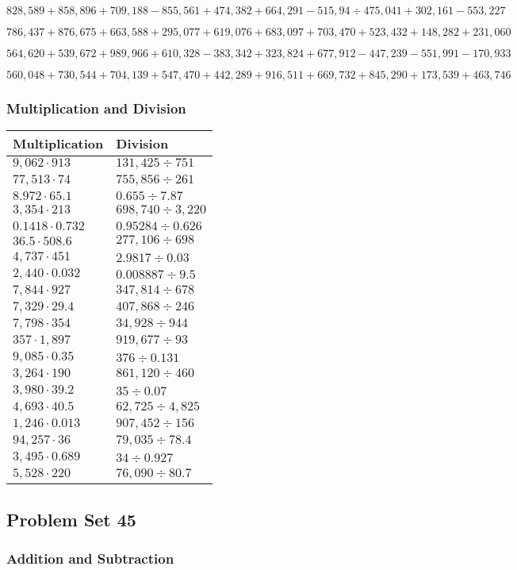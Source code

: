 \(828,589+858,896+709,188-855,561+474,382+664,291-515,94÷475,041+302,161-553,227\)

\(786,437+876,675+663,588+295,077+619,076+683,097+703,470+523,432+148,282+231,060\)

\(564,620+539,672+989,966+610,328-383,342+323,824+677,912-447,239-551,991-170,933\)

\(560,048+730,544+704,139+547,470+442,289+916,511+669,732+845,290+173,539+463,746\)

\hypertarget{multiplication-and-division-348}{%
\subsubsection{Multiplication and
Division}\label{multiplication-and-division-348}}

\begin{longtable}[]{@{}ll@{}}
\toprule
Multiplication & Division\tabularnewline
\midrule
\endhead
\(9,062\cdot913\) & \(131,425÷751\)\tabularnewline
\(77,513\cdot74\) & \(755,856÷261\)\tabularnewline
\(8.972\cdot65.1\) & \(0.655÷7.87\)\tabularnewline
\(3,354\cdot213\) & \(698,740÷3,220\)\tabularnewline
\(0.1418\cdot0.732\) & \(0.95284÷0.626\)\tabularnewline
\(36.5\cdot508.6\) & \(277,106÷698\)\tabularnewline
\(4,737\cdot451\) & \(2.9817÷0.03\)\tabularnewline
\(2,440\cdot0.032\) & \(0.008887÷9.5\)\tabularnewline
\(7,844\cdot927\) & \(347,814÷678\)\tabularnewline
\(7,329\cdot29.4\) & \(407,868÷246\)\tabularnewline
\(7,798\cdot354\) & \(34,928÷944\)\tabularnewline
\(357\cdot1,897\) & \(919,677÷93\)\tabularnewline
\(9,085\cdot0.35\) & \(376÷0.131\)\tabularnewline
\(3,264\cdot190\) & \(861,120÷460\)\tabularnewline
\(3,980\cdot39.2\) & \(35÷0.07\)\tabularnewline
\(4,693\cdot40.5\) & \(62,725÷4,825\)\tabularnewline
\(1,246\cdot0.013\) & \(907,452÷156\)\tabularnewline
\(94,257\cdot36\) & \(79,035÷78.4\)\tabularnewline
\(3,495\cdot0.689\) & \(34÷0.927\)\tabularnewline
\(5,528\cdot220\) & \(76,090÷80.7\)\tabularnewline
\bottomrule
\end{longtable}

\hypertarget{problem-set-45-4}{%
\subsection{Problem Set 45}\label{problem-set-45-4}}

\hypertarget{addition-and-subtraction-350}{%
\subsubsection{Addition and
Subtraction}\label{addition-and-subtraction-350}}

